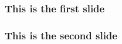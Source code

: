 \documentclass[]{beamer}
\begin{document}
    \begin{frame}
        \frametitle{This is the first slide}        
    \end{frame}
    \begin{frame}
        \frametitle{This is the second slide}        
    \end{frame}
\end{document}
